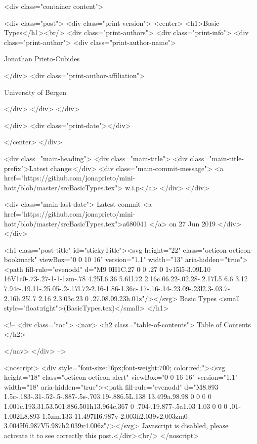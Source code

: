       <div class="container content">
        







<div class="post">
  <div class="print-version">
    <center>
      <h1>Basic Types</h1><br/>
        <div class="print-authors">
          <div class="print-info">
            <div class="print-author">
              <div class="print-author-name">
                
                  Jonathan Prieto-Cubides
                
              </div>
              <div class="print-author-affiliation">
                
                  University of Bergen
                
                </div>
            </div>
          </div>
          
          
        </div>
        <div class="print-date"></div>
        
        
    </center>
  </div>

  
  <div class="main-heading">
    <div class="main-title">
      <div class="main-title-prefix">Latest change:</div>
      <div class="main-commit-message">
            <a href="https://github.com/jonaprieto/mini-hott/blob/master/srcBasicTypes.tex">
              w.i.p</a>
      </div>
    </div>

    <div class="main-last-date">
      Latest commit <a href="https://github.com/jonaprieto/mini-hott/blob/master/srcBasicTypes.tex">a680041 </a> on  27 Jun 2019
    </div>
  </div>
  

  <h1 class="post-title" id="stickyTitle"><svg height="22" class="octicon octicon-bookmark" viewBox="0 0 10 16" version="1.1" width="13" aria-hidden="true"><path fill-rule="evenodd" d="M9 0H1C.27 0 0 .27 0 1v15l5-3.09L10 16V1c0-.73-.27-1-1-1zm-.78 4.25L6.36 5.61l.72 2.16c.06.22-.02.28-.2.17L5 6.6 3.12 7.94c-.19.11-.25.05-.2-.17l.72-2.16-1.86-1.36c-.17-.16-.14-.23.09-.23l2.3-.03.7-2.16h.25l.7 2.16 2.3.03c.23 0 .27.08.09.23h.01z"/></svg> Basic Types <small style="float:right">(BasicTypes.tex)</small>
  </h1>

  <!-- 
  <div class="toc">
    <nav>
    <h2 class="table-of-contents"> Table of Contents </h2>
      

    </nav>
  </div>
   -->

  <noscript>
  <div style="font-size:16px;font-weight:700; color:red;"><svg height="18" class="octicon octicon-alert" viewBox="0 0 16 16" version="1.1" width="18" aria-hidden="true"><path fill-rule="evenodd" d="M8.893 1.5c-.183-.31-.52-.5-.887-.5s-.703.19-.886.5L.138 13.499a.98.98 0 0 0 0 1.001c.193.31.53.501.886.501h13.964c.367 0 .704-.19.877-.5a1.03 1.03 0 0 0 .01-1.002L8.893 1.5zm.133 11.497H6.987v-2.003h2.039v2.003zm0-3.004H6.987V5.987h2.039v4.006z"/></svg> Javascript is disabled, please activate it to see correctly this post.</div><br/>
  </noscript>

